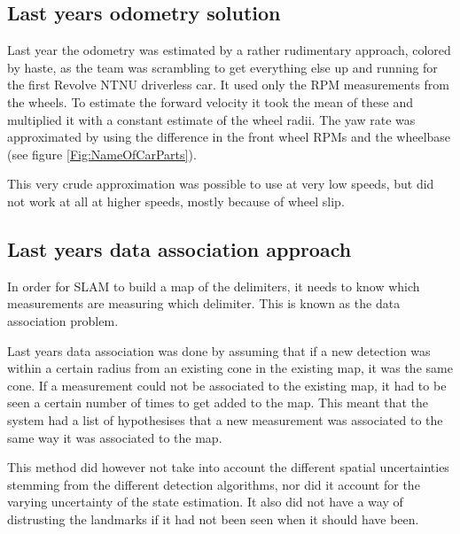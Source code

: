 \subsection{Last years odometry solution}

Last year the odometry was estimated by a rather rudimentary approach, colored by haste, as the team was scrambling to get everything else up and running for the first Revolve NTNU driverless car. It used only the \gls{RPM} measurements from the wheels. To estimate the forward velocity it took the mean of these and multiplied it with a constant estimate of the wheel radii. The yaw rate was approximated by using the difference in the front wheel \glspl{RPM} and the wheelbase (see figure \ref{Fig:NameOfCarParts}).  

This very crude approximation was possible to use at very low speeds, but did not work at all at higher speeds, mostly because of wheel slip. 

\subsection{Last years data association approach}

In order for SLAM to build a map of the delimiters, it needs to know which measurements are measuring which delimiter. This is known as the data association problem.

Last years data association was done by assuming that if a new detection was within a certain radius from an existing cone in the existing map, it was the same cone. If a measurement could not be associated to the existing map, it had to be seen a certain number of times to get added to the map. This meant that the system had a list of hypothesises that a new measurement was associated to the same way it was associated to the map. 

This method did however not take into account the different spatial uncertainties stemming from the different detection algorithms, nor did it account for the varying uncertainty of the state estimation. It also did not have a way of distrusting the landmarks if it had not been seen when it should have been. 